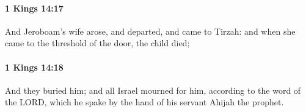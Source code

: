 		\paragraph{1 Kings 14:17} %
			\label{1KINGS-14-17}

			And Jeroboam’s wife arose, and departed, and came to Tirzah: and when she came to the threshold of the door, the child died;


		\paragraph{1 Kings 14:18} %
			\label{1KINGS-14-18}

			And they buried him; and all Israel mourned for him, according to the word of the LORD, which he spake by the hand of his servant Ahijah the prophet.


